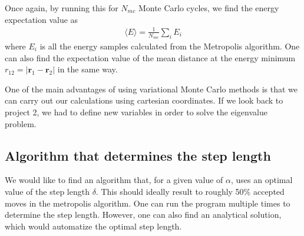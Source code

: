 \documentclass[12pt]{article}
\begin{document}
Once again, by running this for $N_{mc}$ Monte Carlo cycles, we find the energy expectation value as
\begin{align*}
\langle E \rangle = \displaystyle \frac{1}{N_{mc}}\sum_i E_i
\end{align*}
where $E_i$ is all the energy samples calculated from the Metropolis algorithm. One can also find the expectation value of the mean distance at the energy minimum $r_{12} = |\mathbf{r}_1 - \mathbf{r}_2|$ in the same way.

One of the main advantages of using variational Monte Carlo methods is that we can carry out our calculations using cartesian coordinates. If we look back to project 2, we had to define new variables in order to solve the eigenvalue problem.

\subsection{Algorithm that determines the step length}
We would like to find an algorithm that, for a given value of $\alpha$, uses an optimal value of the step length $\delta$. This should ideally result to roughly 50\% accepted moves in the metropolis algorithm. One can run the program multiple times to determine the step length. However, one can also find an analytical solution, which would automatize the optimal step length.
\end{document}
